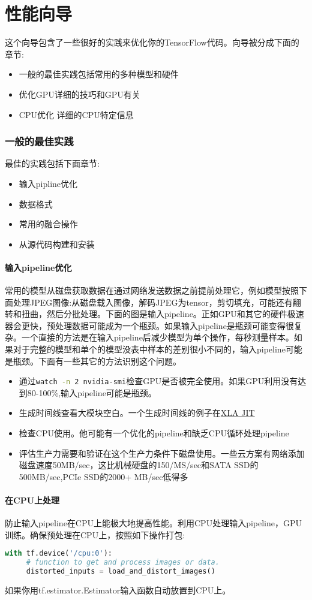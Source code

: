 \chapter{性能向导}
这个向导包含了一些很好的实践来优化你的TensorFlow代码。向导被分成下面的章节:
\begin{itemize}
\item 一般的最佳实践包括常用的多种模型和硬件
\item 优化GPU详细的技巧和GPU有关
\item CPU优化 详细的CPU特定信息
\end{itemize}
\subsection{一般的最佳实践}
最佳的实践包括下面章节:
\begin{itemize}
	\item 输入pipline优化
	\item 数据格式
	\item 常用的融合操作
	\item 从源代码构建和安装
\end{itemize}
\subsubsection{输入pipeline优化}
常用的模型从磁盘获取数据在通过网络发送数据之前提前处理它，例如模型按照下面处理JPEG图像:从磁盘载入图像，解码JPEG为tensor，剪切填充，可能还有翻转和扭曲，然后分批处理。下面的图是输入pipeline。正如GPU和其它的硬件极速器会更快，预处理数据可能成为一个瓶颈。如果输入pipeline是瓶颈可能变得很复杂。一个直接的方法是在输入pipeline后减少模型为单个操作，每秒测量样本。如果对于完整的模型和单个的模型没表中样本的差别很小不同的，输入pipeline可能是瓶颈。下面有一些其它的方法识别这个问题。
\begin{itemize}
	\item 通过\lstinline[language=Bash]{watch -n 2 nvidia-smi}检查GPU是否被完全使用。如果GPU利用没有达到80-100\%,输入pipeline可能是瓶颈。
	\item 生成时间线查看大模块空白。一个生成时间线的例子在\href{https://www.tensorflow.org/performance/xla/jit}{XLA JIT}
	\item 检查CPU使用。他可能有一个优化的pipeline和缺乏CPU循环处理pipeline
	\item 评估生产力需要和验证在这个生产力条件下磁盘使用。一些云方案有网络添加磁盘速度50MB/sec，这比机械硬盘的150/MS/sec和SATA SSD的500MB/sec,PCIe SSD的2000+
 MB/sec低得多\end{itemize}
 \subsubsection{在CPU上处理}
 防止输入pipeline在CPU上能极大地提高性能。利用CPU处理输入pipeline，GPU训练。确保预处理在CPU上，按照如下操作打包:
 \begin{lstlisting}[language=Python]
 with tf.device('/cpu:0'):
     # function to get and process images or data.
     distorted_inputs = load_and_distort_images()
 \end{lstlisting}
 如果你用tf.estimator.Estimator输入函数自动放置到CPU上。
